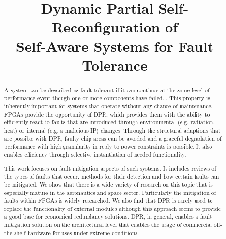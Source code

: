 \documentclass[10pt, journal]{IEEEtran}
\title{Dynamic Partial Self-Reconfiguration of \\Self-Aware Systems for Fault Tolerance}
\author{\IEEEauthorblockN{Constantin Schieber, 01228774}
\IEEEauthorblockA{\\Vienna University of Technology\\
Institute of Computer Technology\\
Vienna, Austria\\
Constantin.Schieber@tuwien.ac.at}
}
\begin{document}
\maketitle

\begin{abstract}
    A system can be described as fault-tolerant if it can continue at the same level of performance event though one or more components have failed. 
.    This property is inherently important for systems that operate without any chance of maintenance.
    \glspl{FPGA} provide the opportunity of \gls{DPR}, which provides them with the ability to efficiently react to faults that are introduced through environmental (e.g. radiation, heat) or internal (e.g. a malicious \gls{IP}) changes.
    Through the structural adaptions that are possible with \gls{DPR}, faulty chip areas can be avoided and a graceful degradation of performance with high granularity in reply to power constraints is possible.
    It also enables efficiency through selective instantiation of needed functionality.
    
    This work focuses on fault mitigation aspects of such systems. 
    It includes reviews of the types of faults that occur, methods for their detection and how certain faults can be mitigated. 
    We show that there is a wide variety of research on this topic that is especially mature in the aeronautics and space sector.
    Particularly the mitigation of faults within \glspl{FPGA} is widely researched.
    We also find that \gls{DPR} is rarely used to replace the functionality of external modules although this approach seems to provide a good base for economical redundancy solutions.
    \gls{DPR}, in general, enables a fault mitigation solution on the architectural level that enables the usage of commercial off-the-shelf hardware for uses under extreme conditions.
\end{abstract}








\end{document}

